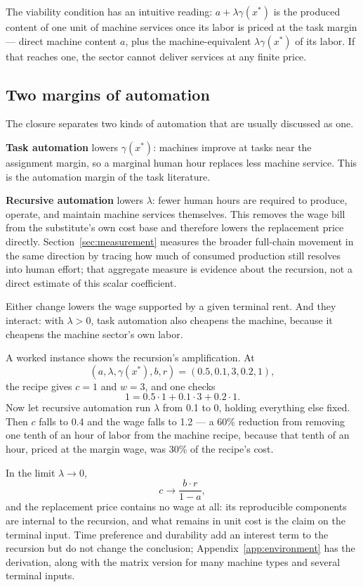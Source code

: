 \documentclass[12pt]{article}
\theoremstyle{plain}
\begin{document}
The viability condition has an intuitive reading:
$a+\lambda\gamma(x^*)$ is the produced content of one unit of machine services
once its labor is priced at the task margin --- direct machine content $a$, plus
the machine-equivalent $\lambda\gamma(x^*)$ of its labor. If that reaches one,
the sector cannot deliver services at any finite price.


\subsection{Two margins of automation}

The closure separates two kinds of automation that are usually discussed as one.

\textbf{Task automation} lowers $\gamma(x^*)$: machines improve at tasks near the
assignment margin, so a marginal human hour replaces less machine service. This
is the automation margin of the task literature.

\textbf{Recursive automation} lowers $\lambda$: fewer human hours are required to
produce, operate, and maintain machine services themselves. This removes the wage
bill from the substitute's own cost base and therefore lowers the replacement
price directly. Section~\ref{sec:measurement} measures the broader full-chain movement in the same direction by tracing how much of consumed production still resolves into human effort; that aggregate measure is evidence about the recursion, not a direct estimate of this scalar coefficient.

Either change lowers the wage supported by a given terminal rent. And they
interact: with $\lambda>0$, task automation also cheapens the machine, because it
cheapens the machine sector's own labor.

A worked instance shows the recursion's amplification. At
\[
(a,\lambda,\gamma(x^*),b,r)=(0.5,0.1,3,0.2,1),
\]
the recipe gives $c=1$ and $w=3$, and one checks
\[
1 = 0.5\cdot1 + 0.1\cdot3 + 0.2\cdot1.
\]
Now let recursive automation run $\lambda$ from 0.1 to 0, holding everything
else fixed. Then $c$ falls to 0.4 and the wage falls to 1.2 --- a 60\% reduction
from removing one tenth of an hour of labor from the machine recipe, because
that tenth of an hour, priced at the margin wage, was 30\% of the recipe's cost.

In the limit $\lambda\to0$,
\begin{equation}\label{eq:lambda-zero}
c \to \frac{b\cdot r}{1-a},
\end{equation}
and the replacement price contains no wage at all: its reproducible components
are internal to the recursion, and what remains in unit cost is the claim on the
terminal input. Time preference and durability add an interest term to the
recursion but do not change the conclusion; Appendix~\ref{app:environment} has
the derivation, along with the matrix version for many machine types and several
terminal inputs.
\end{document}
